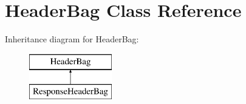 \hypertarget{class_symfony_1_1_component_1_1_http_foundation_1_1_header_bag}{
\section{\-Header\-Bag \-Class \-Reference}
\label{class_symfony_1_1_component_1_1_http_foundation_1_1_header_bag}
}
\-Inheritance diagram for \-Header\-Bag\-:\begin{figure}[H]
\begin{center}
\leavevmode
\includegraphics[height=2.000000cm]{class_symfony_1_1_component_1_1_http_foundation_1_1_header_bag}
\end{center}
\end{figure}
